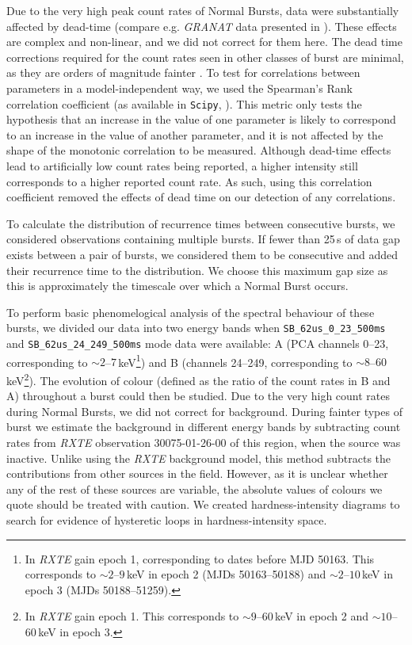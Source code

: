 \par Due to the very high peak count rates of Normal Bursts, data were substantially affected by dead-time (compare e.g. \textit{GRANAT} data presented in \citealp{Sazonov_BPGranat}).  These effects are complex and non-linear, and we did not correct for them here.  The dead time corrections required for the count rates seen in other classes of burst are minimal, as they are orders of magnitude fainter \citep{Giles_BP}.  To test for correlations between parameters in a model-independent way, we used the Spearman's Rank correlation coefficient (as available in \texttt{Scipy}, \citealp{NumPy}).  This metric only tests the hypothesis that an increase in the value of one parameter is likely to correspond to an increase in the value of another parameter, and it is not affected by the shape of the monotonic correlation to be measured.  Although dead-time effects lead to artificially low count rates being reported, a higher intensity still corresponds to a higher reported count rate.   As such, using this correlation coefficient removed the effects of dead time on our detection of any correlations.
\par To calculate the distribution of recurrence times between consecutive bursts, we considered observations containing multiple bursts.  If fewer than 25\,s of data gap exists between a pair of bursts, we considered them to be consecutive and added their recurrence time to the distribution.  We choose this maximum gap size as this is approximately the timescale over which a Normal Burst occurs.
\par To perform basic phenomelogical analysis of the spectral behaviour of these bursts, we divided our data into two energy bands when \texttt{SB\_62us\_0\_23\_500ms} and \texttt{SB\_62us\_24\_249\_500ms} mode data were available: A (PCA channels 0--23, corresponding to $\sim2$--$7$\,keV\footnote{In \textit{RXTE} gain epoch 1, corresponding to dates before MJD 50163.  This corresponds to $\sim2$--$9$\,keV in epoch 2 (MJDs 50163--50188) and $\sim2$--$10$\,keV in epoch 3 (MJDs 50188--51259).}) and B (channels 24--249, corresponding to $\sim8$--$60$\,keV\footnote{In \textit{RXTE} gain epoch 1.  This corresponds to $\sim9$--$60$\,keV in epoch 2 and $\sim10$--$60$\,keV in epoch 3.}).  The evolution of colour (defined as the ratio of the count rates in B and A) throughout a burst could then be studied.  Due to the very high count rates during Normal Bursts, we did not correct for background.  During fainter types of burst we estimate the background in different energy bands by subtracting count rates from \textit{RXTE} observation 30075-01-26-00 of this region, when the source was inactive.  Unlike using the \textit{RXTE} background model, this method subtracts the contributions from other sources in the field.  However, as it is unclear whether any of the rest of these sources are variable, the absolute values of colours we quote should be treated with caution.  We created hardness-intensity diagrams to search for evidence of hysteretic loops in hardness-intensity space.
